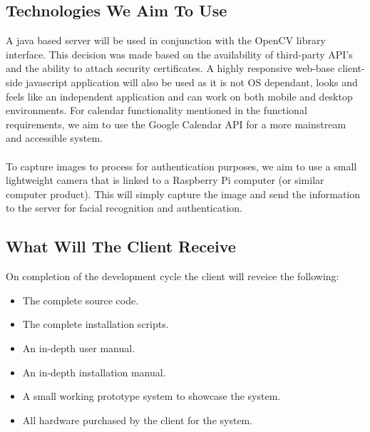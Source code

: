 \subsection{Technologies We Aim To Use}
\begin{flushleft}
A java based server will be used in conjunction with the OpenCV library interface. This decision was made based on the availability of third-party API’s and the ability to attach security certificates.
A highly responsive web-base client-side javascript application will also be used as it is not OS dependant, looks and feels like an independent application and can work on both mobile and desktop environments. For calendar functionality mentioned in the functional requirements, we aim to use the Google Calendar API for a more mainstream and accessible system.\\
\hfill \\
To capture images to process for authentication purposes, we aim to use a small lightweight camera that is linked to a Raspberry Pi computer (or similar computer product). This will simply capture the image and send the information to the server for facial recognition and authentication.
\end{flushleft}

\subsection{What Will The Client Receive}
\begin{flushleft}
On completion of the development cycle the client will reveice the following:\\
\begin{itemize}
	\item The complete source code.
	\item The complete installation scripts.
	\item An in-depth user manual.
	\item An in-depth installation manual.
	\item A small working prototype system to showcase the system.
	\item All hardware purchased by the client for the system.
\end{itemize}
\end{flushleft}